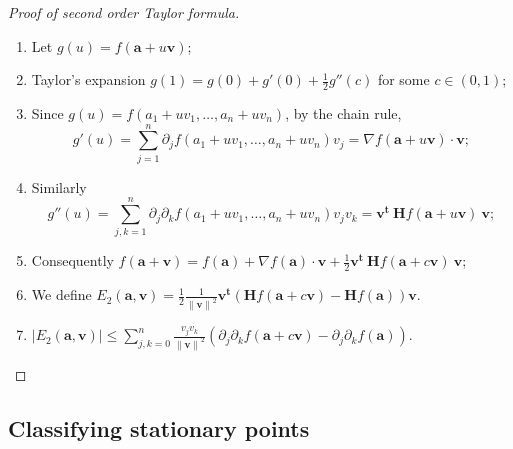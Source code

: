 \documentclass[aspectratio=169,handout]{beamer}
\newcommand{\abs}[1]{\left|#1\right|} %
\newcommand{\norm}[1]{\left\|#1\right\|} %
\renewcommand{\aa}{\mathbf{a}}
\newcommand{\vv}{\mathbf{v}}
\begin{document}
\begin{frame}
    \frametitle{}

    \begin{proof}[Proof of second order Taylor formula]

        \begin{enumerate}
            \item Let \(g(u) = f(\aa + u \vv)\);
            \item Taylor's expansion \(g(1) = g(0) + g'(0) + \frac{1}{2} g''(c)\) for some \(c\in (0,1)\);
            \item Since \(g(u) = f(a_1 + uv_1, \ldots, a_n + u v_n)\), by the chain rule,
                  \[
                      g'(u) = \sum_{j=1}^{n} \partial_j f( a_1 + uv_1, \ldots, a_n + u v_n ) v_j
                      =\nabla f( \aa + u \vv) \cdot \vv;
                  \]
                  \vspace{-2em}
            \item Similarly
                  \vspace{-1em}
                  \[
                      g''(u) = \sum_{j,k=1}^{n} \partial_j\partial_k f( a_1 + uv_1, \ldots, a_n + u v_n ) v_j v_k
                      =  \vv^{\mathbf{t}} \ \mathbf{H} f (\aa + u \vv) \ \vv;
                  \]
                  \vspace{-1em}
            \item Consequently
                  \(
                  f(\aa+\vv) = f(\aa) + \nabla f(\aa) \cdot \vv + \frac{1}{2} \vv^{\mathbf{t}} \ \mathbf{H} f (\aa + c\vv) \ \vv
                  \);
            \item We define \(E_2(\aa,\vv) = \frac{1}{2} \frac{1}{\norm{\vv}^2} \vv^{\mathbf{t}} (\mathbf{H} f (\aa + c\vv) - \mathbf{H} f (\aa)  ) \vv\).
            \item \(\abs{E_2(\aa,\vv)} \leq \sum_{j,k=0}^{n}
                  \frac{v_j v_k}{\norm{\vv}^2} \left( \partial_{j}\partial_{k}f(\aa+c\vv)-\partial_{j}\partial_{k}f(\aa) \right).\)
                  \qedhere
        \end{enumerate}
    \end{proof}
\end{frame}

\subsection{Classifying stationary points}
\end{document}
